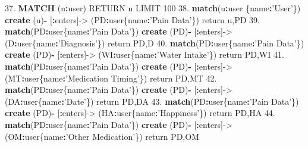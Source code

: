\documentclass[]{book}
\newenvironment{Shaded}{\begin{snugshade}}{\end{snugshade}}
\newcommand{\KeywordTok}[1]{\textcolor[rgb]{0.13,0.29,0.53}{\textbf{#1}}}
\newcommand{\DecValTok}[1]{\textcolor[rgb]{0.00,0.00,0.81}{#1}}
\newcommand{\FloatTok}[1]{\textcolor[rgb]{0.00,0.00,0.81}{#1}}
\newcommand{\StringTok}[1]{\textcolor[rgb]{0.31,0.60,0.02}{#1}}
\newcommand{\OperatorTok}[1]{\textcolor[rgb]{0.81,0.36,0.00}{\textbf{#1}}}
\newcommand{\NormalTok}[1]{#1}
\begin{document}
\begin{Shaded}
\begin{Highlighting}[]
\FloatTok{37.} \KeywordTok{MATCH}\NormalTok{ (n}\OperatorTok{:}\NormalTok{user) RETURN n LIMIT }\DecValTok{100}
\FloatTok{38.} \KeywordTok{match}\NormalTok{(u}\OperatorTok{:}\NormalTok{user \{name}\OperatorTok{:}\StringTok{'User'}\NormalTok{\}) }\KeywordTok{create}\NormalTok{ (u)}\OperatorTok{-}\StringTok{ }\NormalTok{[}\OperatorTok{:}\NormalTok{enters]->}\StringTok{ }\NormalTok{(PD}\OperatorTok{:}\NormalTok{user\{name}\OperatorTok{:}\StringTok{'Pain Data'}\NormalTok{\}) return u,PD}
\FloatTok{39.} \KeywordTok{match}\NormalTok{(PD}\OperatorTok{:}\NormalTok{user\{name}\OperatorTok{:}\StringTok{'Pain Data'}\NormalTok{\}) }\KeywordTok{create}\NormalTok{ (PD)}\OperatorTok{-}\StringTok{ }\NormalTok{[}\OperatorTok{:}\NormalTok{enters]->}\StringTok{ }\NormalTok{(D}\OperatorTok{:}\NormalTok{user\{name}\OperatorTok{:}\StringTok{'Diagnosis'}\NormalTok{\}) return PD,D}
\FloatTok{40.} \KeywordTok{match}\NormalTok{(PD}\OperatorTok{:}\NormalTok{user\{name}\OperatorTok{:}\StringTok{'Pain Data'}\NormalTok{\}) }\KeywordTok{create}\NormalTok{ (PD)}\OperatorTok{-}\StringTok{ }\NormalTok{[}\OperatorTok{:}\NormalTok{enters]->}\StringTok{ }\NormalTok{(WI}\OperatorTok{:}\NormalTok{user\{name}\OperatorTok{:}\StringTok{'Water Intake'}\NormalTok{\}) return PD,WI}
\FloatTok{41.} \KeywordTok{match}\NormalTok{(PD}\OperatorTok{:}\NormalTok{user\{name}\OperatorTok{:}\StringTok{'Pain Data'}\NormalTok{\}) }\KeywordTok{create}\NormalTok{ (PD)}\OperatorTok{-}\StringTok{ }\NormalTok{[}\OperatorTok{:}\NormalTok{enters]->}\StringTok{ }\NormalTok{(MT}\OperatorTok{:}\NormalTok{user\{name}\OperatorTok{:}\StringTok{'Medication Timing'}\NormalTok{\}) return PD,MT}
\FloatTok{42.} \KeywordTok{match}\NormalTok{(PD}\OperatorTok{:}\NormalTok{user\{name}\OperatorTok{:}\StringTok{'Pain Data'}\NormalTok{\}) }\KeywordTok{create}\NormalTok{ (PD)}\OperatorTok{-}\StringTok{ }\NormalTok{[}\OperatorTok{:}\NormalTok{enters]->}\StringTok{ }\NormalTok{(DA}\OperatorTok{:}\NormalTok{user\{name}\OperatorTok{:}\StringTok{'Date'}\NormalTok{\}) return PD,DA}
\FloatTok{43.} \KeywordTok{match}\NormalTok{(PD}\OperatorTok{:}\NormalTok{user\{name}\OperatorTok{:}\StringTok{'Pain Data'}\NormalTok{\}) }\KeywordTok{create}\NormalTok{ (PD)}\OperatorTok{-}\StringTok{ }\NormalTok{[}\OperatorTok{:}\NormalTok{enters]->}\StringTok{ }\NormalTok{(HA}\OperatorTok{:}\NormalTok{user\{name}\OperatorTok{:}\StringTok{'Happiness'}\NormalTok{\}) return PD,HA}
\FloatTok{44.} \KeywordTok{match}\NormalTok{(PD}\OperatorTok{:}\NormalTok{user\{name}\OperatorTok{:}\StringTok{'Pain Data'}\NormalTok{\}) }\KeywordTok{create}\NormalTok{ (PD)}\OperatorTok{-}\StringTok{ }\NormalTok{[}\OperatorTok{:}\NormalTok{enters]->}\StringTok{ }\NormalTok{(OM}\OperatorTok{:}\NormalTok{user\{name}\OperatorTok{:}\StringTok{'Other Medication'}\NormalTok{\}) return PD,OM}

\end{Highlighting}
\end{Shaded}
\end{document}
